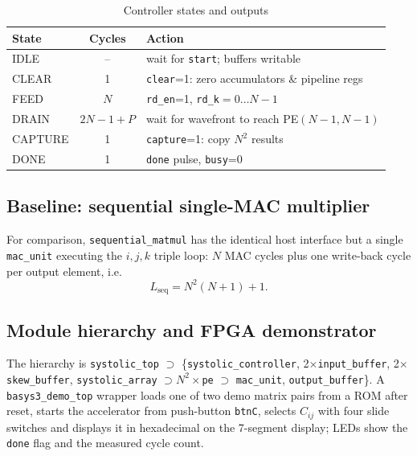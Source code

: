 \documentclass[conference]{IEEEtran}
\begin{document}
\begin{table}[t]
\centering
\caption{Controller states and outputs}
\label{tab:fsm}
\setlength{\tabcolsep}{3pt}
\begin{tabular}{@{}lcl@{}}
\toprule
State & Cycles & Action \\
\midrule
IDLE    & --        & wait for \texttt{start}; buffers writable \\
CLEAR   & 1         & \texttt{clear}=1: zero accumulators \& pipeline regs \\
FEED    & $N$       & \texttt{rd\_en}=1, \texttt{rd\_k}$=0\ldots N{-}1$ \\
DRAIN   & $2N{-}1{+}P$ & wait for wavefront to reach PE$(N{-}1,N{-}1)$ \\
CAPTURE & 1         & \texttt{capture}=1: copy $N^2$ results \\
DONE    & 1         & \texttt{done} pulse, \texttt{busy}=0 \\
\bottomrule
\end{tabular}
\end{table}

\subsection{Baseline: sequential single-MAC multiplier}
For comparison, \texttt{sequential\_matmul} has the identical host interface
but a single \texttt{mac\_unit} executing the $i,j,k$ triple loop: $N$ MAC
cycles plus one write-back cycle per output element, i.e.
\begin{equation}
L_{\text{seq}} = N^2(N+1)+1 .
\end{equation}

\subsection{Module hierarchy and FPGA demonstrator}
The hierarchy is \texttt{systolic\_top} $\supset$ \{\texttt{systolic\_controller},
2$\times$\texttt{input\_buffer}, 2$\times$\texttt{skew\_buffer},
\texttt{systolic\_array} $\supset N^2\times$\texttt{pe} $\supset$
\texttt{mac\_unit}, \texttt{output\_buffer}\}. A \texttt{basys3\_demo\_top}
wrapper loads one of two demo matrix pairs from a ROM after reset, starts the
accelerator from push-button \texttt{btnC}, selects $C_{ij}$ with four slide
switches and displays it in hexadecimal on the 7-segment display; LEDs show the
\texttt{done} flag and the measured cycle count.

\end{document}
